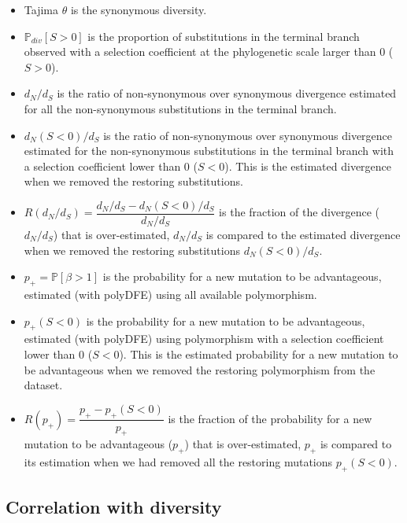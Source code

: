 \documentclass{article}
\newcommand{\proba}{\mathbb{P}}
\newcommand{\dn}{d_N}
\newcommand{\ds}{d_S}
\newcommand{\dnds}{\dn / \ds}
\newcommand{\Sphy}{S}
\newcommand{\Spop}{\beta}
\newcommand{\polyAdv}{ \Spop > 1}
\newcommand{\PpolyAdv}{\proba \left[ \polyAdv \right]}
\begin{document}
    \begin{itemize}
        \item Tajima $\theta$ is the synonymous diversity.
        \item $\mathbb{P}_{div}[\Sphy > 0]$ is the proportion of substitutions in the terminal branch observed with a selection coefficient at the phylogenetic scale larger than 0 ($\Sphy > 0$).
        \item $\dnds$ is the ratio of non-synonymous over synonymous divergence estimated for all the non-synonymous substitutions in the terminal branch.
        \item $\dn(\Sphy < 0) / \ds$ is the ratio of non-synonymous over synonymous divergence estimated for the non-synonymous substitutions in the terminal branch with a selection coefficient lower than 0 ($\Sphy < 0$).
        This is the estimated divergence when we removed the restoring substitutions.
        \item $R(\dnds)=\dfrac{\dnds - \dn(\Sphy < 0) / \ds}{\dnds}$ is the fraction of the divergence ($\dnds$) that is over-estimated, $\dnds$ is compared to the estimated divergence when we removed the restoring substitutions $\dn(\Sphy < 0) / \ds$.
        \item $p_+=\PpolyAdv$ is the probability for a new mutation to be advantageous, estimated (with polyDFE) using all available polymorphism.
        \item $p_+(\Sphy < 0)$ is the probability for a new mutation to be advantageous, estimated (with polyDFE) using polymorphism with a selection coefficient lower than 0 ($\Sphy < 0$).
        This is the estimated probability for a new mutation to be advantageous when we removed the restoring polymorphism from the dataset.
        \item $R(p_+)=\dfrac{p_+ - p_+(\Sphy < 0)}{p_+}$ is the fraction of the probability for a new mutation to be advantageous ($p_+$) that is over-estimated, $p_+$ is compared to its estimation when we had removed all the restoring mutations $p_+(\Sphy < 0)$.
    \end{itemize}

    \newpage
    \subsection{Correlation with diversity}
\end{document}
